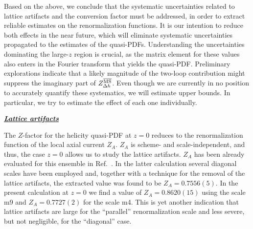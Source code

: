 \documentclass[12pt,tighten,nofootinbib,amssymb,floatfix]{article}
\begin{document}
\vspace*{0.5cm}
Based on the above, we conclude that the systematic uncertainties related to lattice artifacts and the conversion factor must be addressed, 
in order to extract reliable estimates on the renormalization functions. It is our intention to reduce both effects in the near future, which 
will eliminate systematic uncertainties propagated to the estimates of the quasi-PDFs. 
Understanding the uncertainties dominating the large-$z$ region is crucial, as the matrix element for these values also enters in the Fourier 
transform that yields the quasi-PDF. Preliminary explorations indicate that a likely magnitude of the two-loop contribution might suppress 
the imaginary part of $Z_{\Delta h}^{\overline{\rm MS}}$. Even though we are currently in no position to accurately quantify these systematics, 
we will estimate upper bounds. In particular, we try to estimate the effect of each one individually.


\vskip 0.75cm
\centerline{\bf\underline{\textit{Lattice artifacts}}}
\vskip 0.25cm

The $Z$-factor for the helicity quasi-PDF at $z{=}0$ reduces to the renormalization function of the local axial current $Z_A$. 
$Z_A$ is scheme- and scale-independent, and thus, the case $z{=}0$ allows us to study the lattice artifacts.  $Z_A$ has been
already evaluated for this ensemble in Ref.~\cite{Alexandrou:2015sea}. In the latter calculation several diagonal scales have 
been employed and, together with a technique for the removal of the lattice artifacts, the extracted value was found to be 
$Z_A{=}0.7556(5)$. In the present calculation at $z{=}0$ we find a value of $Z_A{=}0.8620(15)$ using the scale m9 and 
$Z_A{=}0.7727(2)$ for the scale m4. This is yet another indication that lattice artifacts are large for the  ``parallel'' 
renormalization scale and less severe, but not negligible, for the ``diagonal'' case. 
\end{document}
